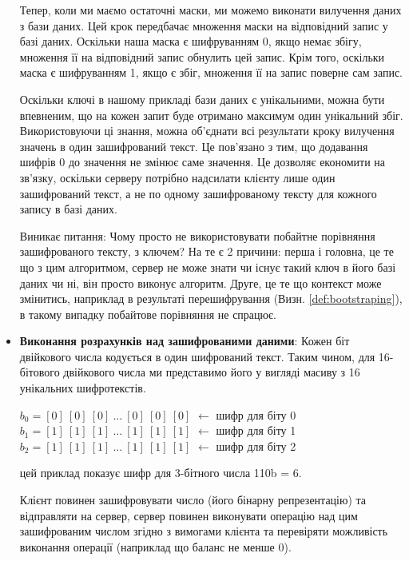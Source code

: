\begin{itemize}
{Тепер, коли ми маємо остаточні маски, ми можемо виконати вилучення даних з бази даних. Цей крок
передбачає множення маски на відповідний запис у базі даних. Оскільки наша маска є шифруванням 0,
якщо немає збігу, множення її на відповідний запис обнулить цей запис. Крім того, оскільки маска
є шифруванням 1, якщо є збіг, множення її на запис поверне сам запис. 

Оскільки ключі в нашому прикладі бази даних є унікальними, можна бути впевненим, що на кожен
запит буде отримано максимум один унікальний збіг. Використовуючи ці знання, можна об'єднати всі
результати кроку вилучення значень в один зашифрований текст. Це пов'язано з тим, що додавання
шифрів 0 до значення не змінює саме значення. Це дозволяє економити на зв'язку, оскільки серверу
потрібно надсилати клієнту лише один зашифрований текст, а не по одному зашифрованому тексту для
кожного запису в базі даних.

Виникає питання: Чому просто не використовувати побайтне порівняння зашифрованого тексту, з
ключем? На те є 2 причини: перша і головна, це те що з цим алгоритмом, сервер не може 
знати чи існує такий ключ в його базі даних чи ні, він просто виконує алгоритм. Друге,
це те що контекст може змінитись, наприклад в результаті перешифрування (Визн. \ref{def:bootstraping}), в такому випадку побайтове порівняння не спрацює.

}
    \item{\textbf{Виконання розрахунків над зашифрованими даними}:
Кожен біт двійкового числа кодується в один шифрований текст. Таким чином, для 16-бітового
двійкового числа ми представимо його у вигляді масиву з 16 унікальних шифротекстів.

\begin{centering}
    \(b_0 = [0]\ [0]\ [0]\ ...\ [0]\ [0]\ [0]\)     \(\leftarrow\) шифр для біту 0\\
    \(b_1 = [1]\ [1]\ [1]\ ...\ [1]\ [1]\ [1]\)     \(\leftarrow\) шифр для біту 1\\
    \(b_2 = [1]\ [1]\ [1]\ ...\ [1]\ [1]\ [1]\)     \(\leftarrow\) шифр для біту 2\\
\end{centering}
 цей приклад показує шифр для 3-бітного числа 110b = 6.

 Клієнт повинен зашифровувати число (його бінарну репрезентацію) та відправляти на сервер,
 сервер повинен виконувати операцію над цим зашифрованим числом згідно з вимогами клієнта та
 перевіряти можливість виконання операції (наприклад що баланс не менше 0).
}
\end{itemize}


